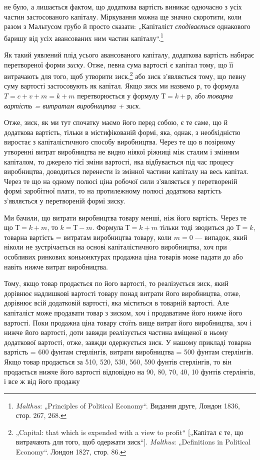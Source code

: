 \parcont{}  %
не було, а лишається фактом, що додаткова вартість виникає одночасно
з усіх частин застосованого капіталу. Міркування можна
ще значно скоротити, коли разом з Мальтусом грубо й просто
сказати: „Капіталіст \emph{сподівається} однакового баришу від усіх
авансованих ним частин капіталу“.\footnote{
\emph{Malthus}: „Principles of Political Economy“. Видання друге, Лондон 1836,
стор. 267, 268.
}

Як такий уявлений плід усього авансованого капіталу, додаткова
вартість набирає перетвореної форми \emph{зиску}. Отже, певна
сума вартості є капітал тому, що її витрачають для того, щоб
утворити зиск,\footnote{
„Capital: that which is expended with a view to profit“ [„Капітал є те, що
витрачають для того, щоб одержати зиск“]. \emph{Malthus}: „Definitions in Political
Economy“. Лондон 1827, стор. 86.
} або зиск з’являється тому, що певну суму вартості
застосовують як капітал. Якщо зиск ми назвемо $р$, то формула
$T = c + v + m = k + m$ перетворюється у формулу $Т = k + р$, або
\emph{товарна вартість = витратам виробництва + зиск}.

Отже, зиск, як ми тут спочатку маємо його перед собою,
є те саме, що й додаткова вартість, тільки в містифікованій
формі, яка, однак, з необхідністю виростає з капіталістичного
способу виробництва. Через те що в позірному утворенні витрат
виробництва не видно ніякої ріжниці між сталим і змінним
капіталом, то джерело тієї зміни вартості, яка відбувається
під час процесу виробництва, доводиться перенести із змінної
частини капіталу на весь капітал. Через те що на одному полюсі
ціна робочої сили з’являється у перетвореній формі заробітної
плати, то на протилежному полюсі додаткова вартість з’являється
у перетвореній формі зиску.

Ми бачили, що витрати виробництва товару менші, ніж його
вартість. Через те що $Т = k + m$, то $k = Т - m$. Формула
$Т = k + m$ тільки тоді зводиться до $Т = k$, товарна вартість =
витратам виробництва товару, коли $m = 0$ — випадок, який
ніколи не зустрічається на основі капіталістичного виробництва,
хоч при особливих ринкових коньюнктурах продажна ціна товарів
може падати до або навіть нижче витрат виробництва.

Тому, якщо товар продається по його вартості, то реалізується
зиск, який дорівнює надлишкові вартості товару понад витрати
його виробництва, отже, дорівнює всій додатковій вартості, яка
міститься в товарній вартості. Але капіталіст може продавати
товар з зиском, хоч і продаватиме його нижче його вартості.
Поки продажна ціна товару стоїть вище витрат його виробництва,
хоч і нижче його вартості, доти завжди реалізується
частина вміщеної в ньому додаткової вартості, отже, завжди
одержується зиск. У нашому прикладі товарна вартість = 600
фунтам стерлінгів, витрати виробництва = 500 фунтам стерлінгів.
Якщо товар продається за 510, 520, 530, 560, 590 фунтів
стерлінгів, то він продається нижче його вартості відповідно на
90, 80, 70, 40, 10 фунтів стерлінгів, і все ж від його продажу
\parbreak{}  %
